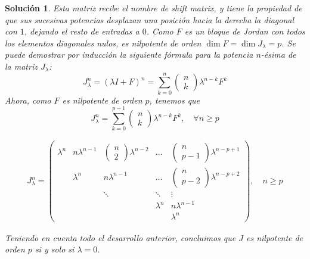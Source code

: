 \documentclass[11pt, a4paper]{article}
\newif\IfInSansMode
\numberwithin{equation}{section}
\theoremstyle{theorem-style}
\theoremstyle{definition-style}
\theoremstyle{remark-style}
\newtheorem*{sol}{Solución}
\theoremstyle{example-style}
\begin{document}
\begin{sol}
        Esta matriz recibe el nombre de \textit{shift matrix}, y tiene la propiedad de que sus sucesivas potencias desplazan una posición hacia la derecha la diagonal con $1$, dejando el resto de entradas a $0$. Como $F$ es un bloque de Jordan con todos los elementos diagonales nulos, es nilpotente de orden $\dim F = \dim J_\lambda = p$. Se puede demostrar por inducción la siguiente fórmula para la potencia $n$-ésima de la matriz $J_\lambda$: $$ J_\lambda^n = (\lambda I + F)^n = \sum^{n}_{k=0} \begin{pmatrix}
            n \\
            k
        \end{pmatrix} \lambda^{n-k} F^k$$
        Ahora, como $F$ es nilpotente de orden $p$, tenemos que $$ J_\lambda^n = \sum^{p-1}_{k=0} \begin{pmatrix}
            n \\
            k
        \end{pmatrix} \lambda^{n-k} F^k, \quad  \forall n \geq p $$

        \begin{align*}
            \label{}
            J^n_\lambda = 
            \begin{pmatrix}
                \lambda^n & n\lambda^{n-1} & \begin{pmatrix}
                    n\\
                    2
                \end{pmatrix} \lambda^{n-2} & \hdots & \begin{pmatrix}
                    n \\
                    p-1
                \end{pmatrix} \lambda^{n-p +1} \\
                & \lambda^n & n\lambda^{n-1} & \hdots & \begin{pmatrix}
                n\\
                p-2
            \end{pmatrix} \lambda^{n-p+2}\\
            &  & \ddots & \ddots & \vdots \\
            & & & \lambda^n & n\lambda^{n-1}\\
            & & & & \lambda^n
        \end{pmatrix},\quad n \ge p
    \end{align*}

    Teniendo en cuenta todo el desarrollo anterior, concluimos que $J$ es nilpotente de orden $p$ si y solo si $\lambda = 0$.


\end{sol}
\end{document}
